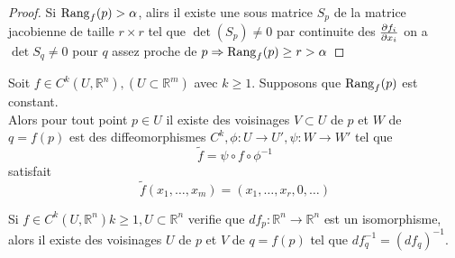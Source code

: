 \documentclass[../main.tex]{subfiles}
\begin{document}
\begin{proof}
	Si $\operatorname{Rang}_f( p) >\alpha$, alirs il existe une sous matrice $S_p$ de la matrice jacobienne de taille $r\times r$ tel que $\det ( S_p) \neq 0$ par continuite des $ \frac{\partial f_i}{\partial x_i}$ on a $\det S_q \neq 0$ pour $q$ assez proche de $p \Rightarrow \operatorname{Rang}_f( p) \geq r > \alpha$ 
\end{proof}
\begin{thm}
	Soit $f\in C^{k}( U, \mathbb{R}^{n}) , ( U \subset \mathbb{R}^m) $ avec $k \geq 1$. Supposons que $\operatorname{Rang}_f( p) $ est constant.\\
	Alors pour tout point $p\in U$ il existe des voisinages $V \subset U$ de $p$ et $W$ de $q= f( p) $ est des diffeomorphismes $C^{k}, \phi: U \to U', \psi: W \to W'$ tel que
	\[ 
	\tilde f = \psi \circ f \circ \phi^{-1}
	\]
	satisfait
	\[ 
		\tilde f( x_1,\ldots, x_m) = ( x_1, \ldots, x_r, 0, \ldots) 
	\]
	
\end{thm}
\begin{crly}
	Si $f\in C^{k}( U, \mathbb{R}^n) k \geq 1, U \subset \mathbb{R}^n$ 
	verifie que $df_p: \mathbb{R}^n\to \mathbb{R}^n$ est un isomorphisme, alors il existe des voisinages $U$ de $p$ et $V$ de $q= f( p) $ tel que $df^{-1}_q= ( df_q)^{-1}$.
\end{crly}



	
\end{document}
